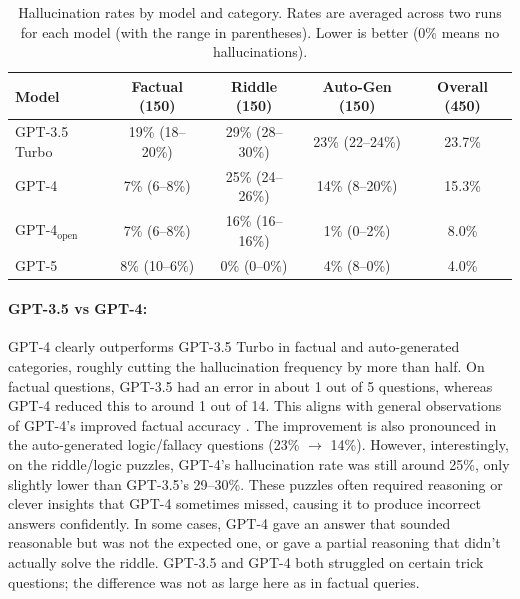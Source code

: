 \documentclass{article}
\begin{document}
\begin{table}[h]
    \centering
    \caption{Hallucination rates by model and category. Rates are averaged across two runs for each model (with the range in parentheses). Lower is better (0\% means no hallucinations).}
    \label{tab:hallucination-rates}
    \begin{tabular}{lcccc}
    \toprule
    \textbf{Model} & \textbf{Factual (150)} & \textbf{Riddle (150)} & \textbf{Auto-Gen (150)} & \textbf{Overall (450)} \\
    \midrule
    GPT-3.5 Turbo & 19\% (18--20\%) & 29\% (28--30\%) & 23\% (22--24\%) & 23.7\% \\
    GPT-4 & 7\% (6--8\%) & 25\% (24--26\%) & 14\% (8--20\%) & 15.3\% \\
    GPT-4$_\text{open}$ & 7\% (6--8\%) & 16\% (16--16\%) & 1\% (0--2\%) & 8.0\% \\
    GPT-5 & 8\% (10--6\%) & 0\% (0--0\%) & 4\% (8--0\%) & 4.0\% \\
    \bottomrule
    \end{tabular}
\end{table}

\paragraph{GPT-3.5 vs GPT-4:} GPT-4 clearly outperforms GPT-3.5 Turbo in factual and auto-generated categories, roughly cutting the hallucination frequency by more than half. On factual questions, GPT-3.5 had an error in about 1 out of 5 questions, whereas GPT-4 reduced this to around 1 out of 14. This aligns with general observations of GPT-4's improved factual accuracy \cite{openai2023gpt4}. The improvement is also pronounced in the auto-generated logic/fallacy questions (23\% $\to$ 14\%). However, interestingly, on the riddle/logic puzzles, GPT-4's hallucination rate was still around 25\%, only slightly lower than GPT-3.5’s 29--30\%. These puzzles often required reasoning or clever insights that GPT-4 sometimes missed, causing it to produce incorrect answers confidently. In some cases, GPT-4 gave an answer that sounded reasonable but was not the expected one, or gave a partial reasoning that didn’t actually solve the riddle. GPT-3.5 and GPT-4 both struggled on certain trick questions; the difference was not as large here as in factual queries.
\end{document}
